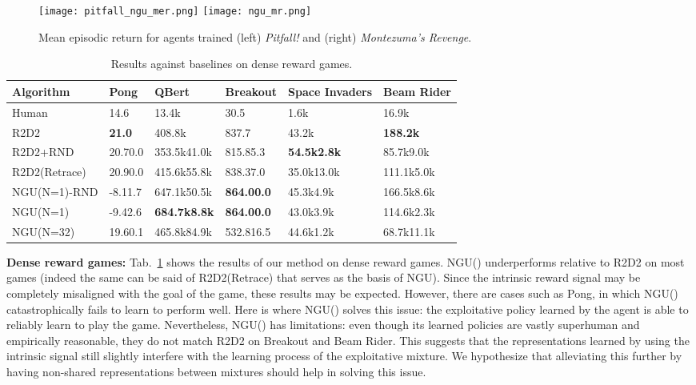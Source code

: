 \documentclass{article} \usepackage{iclr2020_conference,times}
\begin{document}
\begin{figure}
        \centering
        \texttt{[image: pitfall\_ngu\_mer.png]} 
    \hspace{2ex}
        \texttt{[image: ngu\_mr.png]}  
        \vspace{-2ex}
        \label{ap_mr_graph}
        \caption{Mean episodic return for agents trained (left) \textit{Pitfall!} and (right) \textit{Montezuma's Revenge}.} 
\vspace{-2ex}
\end{figure}
\begin{table}[!t]
\small
\centering
\begin{tabular}{m{2.5cm}|m{1.3cm}m{1.8cm}m{1.6cm}m{2.1cm}m{1.5cm}}
Algorithm & Pong & QBert & Breakout & Space Invaders & Beam Rider\\ \hline
Human & 14.6 & 13.4k & 30.5 & 1.6k & 16.9k \\ \hline
R2D2 & \textbf{21.0} & 408.8k & 837.7 & 43.2k & \textbf{188.2k} \\
R2D2+RND & 20.70.0 & 353.5k41.0k & 815.85.3 & \textbf{54.5k2.8k} & 85.7k9.0k\\
R2D2(Retrace) & 20.90.0 & 415.6k55.8k & 838.37.0 & 35.0k13.0k & 111.1k5.0k\\
NGU(N=1)-RND & -8.11.7 & 647.1k50.5k & \textbf{864.00.0} & 45.3k4.9k & 166.5k8.6k\\
NGU(N=1) & -9.42.6 & \textbf{684.7k8.8k} & \textbf{864.00.0} & 43.0k3.9k & 114.6k2.3k\\
NGU(N=32) & 19.60.1 & 465.8k84.9k & 532.816.5 & 44.6k1.2k & 68.7k11.1k
\end{tabular}
\caption{Results against baselines on dense reward games.}
\label{table_single_mixture_dense_games}
\vspace{-3ex}
\end{table}

{\bf Dense reward games: } Tab.~\ref{table_single_mixture_dense_games} shows the results of our method on dense reward games. NGU() underperforms relative to R2D2 on most games (indeed the same can be said of R2D2(Retrace) that serves as the basis of NGU). Since the intrinsic reward signal may be completely misaligned with the goal of the game, these results may be expected. However, there are cases such as Pong, in which NGU() catastrophically fails to learn to perform well. Here is where NGU() solves this issue: the exploitative policy learned by the agent is able to reliably learn to play the game. Nevertheless, NGU() has limitations: even though its learned policies are vastly superhuman and empirically reasonable, they do not match R2D2 on Breakout and Beam Rider. This suggests that the representations learned by using the intrinsic signal still slightly interfere with the learning process of the exploitative mixture. We hypothesize that alleviating this further by having non-shared representations between mixtures should help in solving this issue.
\end{document}
